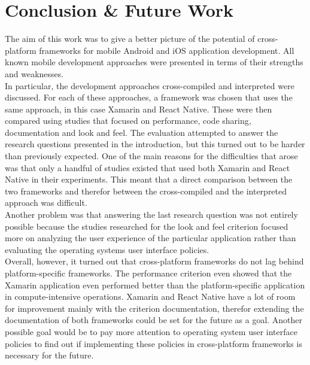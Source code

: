 \documentclass[Bachelor,BIF,english]{twbook}
\newcommand{\FHTWCitationType}{IEEE} %
\begin{document}
\chapter{Conclusion \& Future Work}
The aim of this work was to give a better picture of the potential of cross-platform frameworks for mobile Android and iOS application development. All known mobile development approaches were presented in terms of their strengths and weaknesses.
\\[\baselineskip]
In particular, the development approaches cross-compiled and interpreted were discussed. For each of these approaches, a framework was chosen that uses the same approach, in this case Xamarin and React Native. These were then compared using studies that focused on performance, code sharing, documentation and look and feel. The evaluation attempted to answer the research questions presented in the introduction, but this turned out to be harder than previously expected. One of the main reasons for the difficulties that arose was that only a handful of studies existed that used both Xamarin and React Native in their experiments. This meant that a direct comparison between the two frameworks and therefor between the cross-compiled and the interpreted approach was difficult.
\\[\baselineskip]
Another problem was that answering the last research question was not entirely possible because the studies researched for the look and feel criterion focused more on analyzing the user experience of the particular application rather than evaluating the operating systems user interface policies.
\\[\baselineskip]
Overall, however, it turned out that cross-platform frameworks do not lag behind platform-specific frameworks. The performance criterion even showed that the Xamarin application even performed better than the platform-specific application in compute-intensive operations. Xamarin and React Native have a lot of room for improvement mainly with the criterion documentation, therefor extending the documentation of both frameworks could be set for the future as a goal. Another possible goal would be to pay more attention to operating system user interface policies to find out if implementing these policies in cross-platform frameworks is necessary for the future.




\clearpage
\ifthenelse{\equal{\FHTWCitationType}{HARVARD}}{}{}

\clearpage
\end{document}
